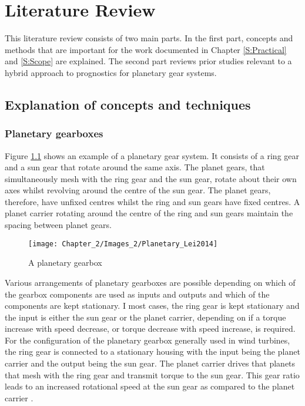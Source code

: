 
\chapter{ Literature Review}
This literature review consists of two main parts. In the first part, concepts and methods that are important for the work documented in Chapter \ref{S:Practical} and \ref{S:Scope} are explained. The second part reviews prior studies relevant to a hybrid approach to prognostics for planetary gear systems.

\section{Explanation of concepts and techniques}

\subsection{Planetary gearboxes} \label{S:Literature}

Figure \ref{F:Planetary_Lei2014} shows an example of a planetary gear system. It consists of a ring gear and a sun gear that rotate around the same axis. The planet gears, that simultaneously mesh with the ring gear and the sun gear, rotate about their own axes whilst revolving around the centre of the sun gear. The planet gears, therefore, have unfixed centres whilst the ring and sun gears have fixed centres. A planet carrier rotating around the centre of the ring and sun gears maintain the spacing between planet gears. 
\begin{figure}[H]
	\centering
	\texttt{[image: Chapter\_2/Images\_2/Planetary\_Lei2014]}
	\caption{A planetary gearbox \citep{Lei2014}}
	\label{F:Planetary_Lei2014}
\end{figure}




Various arrangements of planetary gearboxes are possible depending on which of the gearbox components are used as inputs and outputs and which of the components are kept stationary. I most cases, the ring gear is kept stationary and the input is either the sun gear or the planet carrier, depending on if a torque increase with speed decrease, or torque decrease with speed increase, is required. For the configuration of the planetary gearbox generally used in wind turbines, the ring gear is connected to a stationary housing with the input being the planet carrier and the output being the sun gear. The planet carrier drives that planets that mesh with the ring gear and transmit torque to the sun gear. This gear ratio leads to an increased rotational speed at the sun gear as compared to the planet carrier \cite{Zimroz2014}. 


